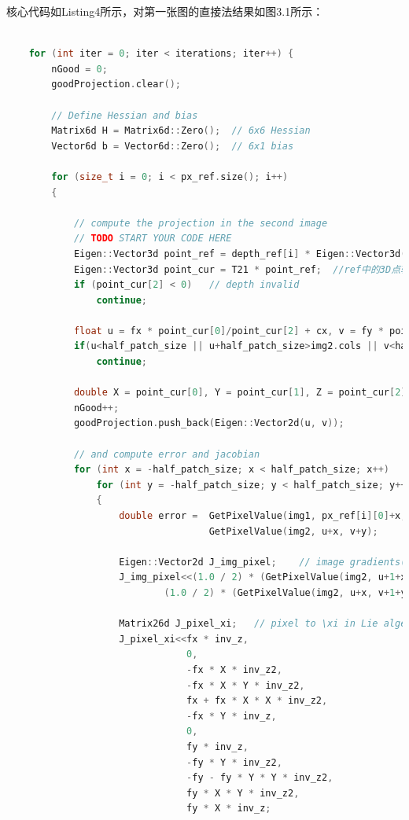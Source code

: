 \documentclass[40pt,a4paper，UTF8]{ctexart}
\numberwithin{equation}{section}
\begin{document}
核心代码如Listing4所示，对第一张图的直接法结果如图3.1所示：
\begin{lstlisting}[language=C++, caption=单层直接法核心代码]

    for (int iter = 0; iter < iterations; iter++) {
        nGood = 0;
        goodProjection.clear();

        // Define Hessian and bias
        Matrix6d H = Matrix6d::Zero();  // 6x6 Hessian
        Vector6d b = Vector6d::Zero();  // 6x1 bias

        for (size_t i = 0; i < px_ref.size(); i++)
        {

            // compute the projection in the second image
            // TODO START YOUR CODE HERE
            Eigen::Vector3d point_ref = depth_ref[i] * Eigen::Vector3d((px_ref[i][0]-cx)/fx, (px_ref[i][1]-cy)/fy, 1);  //ref中的3D点坐标
            Eigen::Vector3d point_cur = T21 * point_ref;  //ref中的3D点转换到cur中的3D点
            if (point_cur[2] < 0)   // depth invalid
                continue;

            float u = fx * point_cur[0]/point_cur[2] + cx, v = fy * point_cur[1]/point_cur[2] + cy;
            if(u<half_patch_size || u+half_patch_size>img2.cols || v<half_patch_size || v+half_patch_size>img2.rows)  //变换到cur中若越界则不优化
                continue;

            double X = point_cur[0], Y = point_cur[1], Z = point_cur[2], inv_z = 1.0 / Z, inv_z2 = inv_z * inv_z;  //cur中的3D坐标X'Y'Z'
            nGood++;
            goodProjection.push_back(Eigen::Vector2d(u, v));

            // and compute error and jacobian
            for (int x = -half_patch_size; x < half_patch_size; x++)
                for (int y = -half_patch_size; y < half_patch_size; y++)
                {
                    double error =  GetPixelValue(img1, px_ref[i][0]+x, px_ref[i][1]+y) -
                                    GetPixelValue(img2, u+x, v+y);

                    Eigen::Vector2d J_img_pixel;    // image gradients(2*1)  像素梯度,使用cur中的像素坐标和窗口偏移量x，y计算*
                    J_img_pixel<<(1.0 / 2) * (GetPixelValue(img2, u+1+x, v+y)-GetPixelValue(img2, u-1+x, v+y)),
                            (1.0 / 2) * (GetPixelValue(img2, u+x, v+1+y)-GetPixelValue(img2, u+x, v-1+y));

                    Matrix26d J_pixel_xi;   // pixel to \xi in Lie algebra  2*6
                    J_pixel_xi<<fx * inv_z,
                                0,
                                -fx * X * inv_z2,
                                -fx * X * Y * inv_z2,
                                fx + fx * X * X * inv_z2,
                                -fx * Y * inv_z,
                                0,
                                fy * inv_z,
                                -fy * Y * inv_z2,
                                -fy - fy * Y * Y * inv_z2,
                                fy * X * Y * inv_z2,
                                fy * X * inv_z;


\end{lstlisting}
\end{document}
